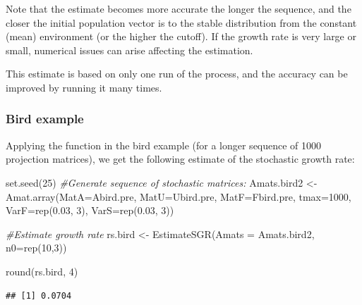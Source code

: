 \documentclass[
]{book}
\newenvironment{Shaded}{\begin{snugshade}}{\end{snugshade}}
\newcommand{\AttributeTok}[1]{\textcolor[rgb]{0.77,0.63,0.00}{#1}}
\newcommand{\CommentTok}[1]{\textcolor[rgb]{0.56,0.35,0.01}{\textit{#1}}}
\newcommand{\DecValTok}[1]{\textcolor[rgb]{0.00,0.00,0.81}{#1}}
\newcommand{\FloatTok}[1]{\textcolor[rgb]{0.00,0.00,0.81}{#1}}
\newcommand{\FunctionTok}[1]{\textcolor[rgb]{0.00,0.00,0.00}{#1}}
\newcommand{\NormalTok}[1]{#1}
\newcommand{\OtherTok}[1]{\textcolor[rgb]{0.56,0.35,0.01}{#1}}
\begin{document}
Note that the estimate becomes more accurate the longer the sequence, and the closer the initial population vector is to the stable distribution from the constant (mean) environment (or the higher the cutoff). If the growth rate is very large or small, numerical issues can arise affecting the estimation.

This estimate is based on only one run of the process, and the accuracy can be improved by running it many times.

\hypertarget{bird-example-20}{%
\subsubsection*{Bird example}\label{bird-example-20}}

Applying the function in the bird example (for a longer sequence of 1000 projection matrices), we get the following estimate of the stochastic growth rate:

\begin{Shaded}
\begin{Highlighting}[]
\FunctionTok{set.seed}\NormalTok{(}\DecValTok{25}\NormalTok{)}
\CommentTok{\#Generate sequence of stochastic matrices:}
\NormalTok{Amats.bird2 }\OtherTok{\textless{}{-}} \FunctionTok{Amat.array}\NormalTok{(}\AttributeTok{MatA=}\NormalTok{Abird.pre, }
                          \AttributeTok{MatU=}\NormalTok{Ubird.pre, }
                          \AttributeTok{MatF=}\NormalTok{Fbird.pre, }
                          \AttributeTok{tmax=}\DecValTok{1000}\NormalTok{, }
                          \AttributeTok{VarF=}\FunctionTok{rep}\NormalTok{(}\FloatTok{0.03}\NormalTok{, }\DecValTok{3}\NormalTok{),}
                          \AttributeTok{VarS=}\FunctionTok{rep}\NormalTok{(}\FloatTok{0.03}\NormalTok{, }\DecValTok{3}\NormalTok{)) }

\CommentTok{\#Estimate growth rate}
\NormalTok{rs.bird }\OtherTok{\textless{}{-}} \FunctionTok{EstimateSGR}\NormalTok{(}\AttributeTok{Amats =}\NormalTok{ Amats.bird2, }
                       \AttributeTok{n0=}\FunctionTok{rep}\NormalTok{(}\DecValTok{10}\NormalTok{,}\DecValTok{3}\NormalTok{))}

\FunctionTok{round}\NormalTok{(rs.bird, }\DecValTok{4}\NormalTok{)}
\end{Highlighting}
\end{Shaded}

\begin{verbatim}
## [1] 0.0704
\end{verbatim}
\end{document}
